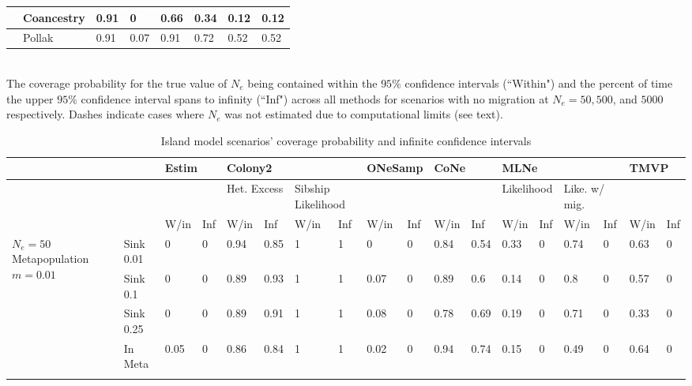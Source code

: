 \begin{landscape}
\begin{table}[h]
\begin{tabular}{ | l| p{2cm}|| l| l|| l| l|| l| l| }
 & Coancestry & 0.91 & 0 & 0.66 & 0.34 & 0.12 & 0.12  \\ \hline
 & Pollak & 0.91 & 0.07 & 0.91 & 0.72 & 0.52 & 0.52  \\ \hline
\end{tabular}
\bigskip{}
{\footnotesize \\ The coverage probability for the true value of $N_e$ being contained within the $95\%$ confidence intervals (``Within") and the percent of time the upper $95\%$ confidence interval spans to infinity (``Inf") across all methods for scenarios with no migration at $N_e = 50, 500$, and $5000$ respectively. Dashes indicate cases where $N_e$ was not estimated due to computational limits (see text).}
\end{table}



\begin{table}[h]
\centering \tiny
\caption[Island model scenarios' coverage probability and infinite confidence intervals]{Island model scenarios' coverage probability and infinite confidence intervals}
\label{tab:ne7}
\begin{tabular}{ | l| l|| l| l| l| l| l| l| l| l| l| l| l| l| l| l| l| l| }
\hline
\multicolumn{2}{l}{} & \multicolumn{2}{l}{Estim} & \multicolumn{4}{l}{Colony2} & \multicolumn{2}{l}{ONeSamp} & \multicolumn{2}{l}{CoNe} & \multicolumn{4}{l}{MLNe} & \multicolumn{2}{l}{TMVP}  \\ \hline
\multicolumn{2}{l}{} & \multicolumn{2}{l}{ } & \multicolumn{2}{l}{ Het. Excess} & \multicolumn{2}{l}{ Sibship Likelihood} & \multicolumn{2}{l}{ } & \multicolumn{2}{l}{ } & \multicolumn{2}{l}{Likelihood} & \multicolumn{2}{l}{Like. w/ mig.} & \multicolumn{2}{l}{ } \\ \hline
 &  & W/in & Inf & W/in & Inf & W/in & Inf & W/in & Inf & W/in & Inf & W/in & Inf & W/in & Inf & W/in & Inf   \\ \hline
\multirow{5}{1cm}{$N_e = 50$ Metapopulation $m = 0.01$} & Sink 0.01 & 0 & 0 & 0.94 & 0.85 & 1 & 1 & 0 & 0 & 0.84 & 0.54 & 0.33 & 0 & 0.74 & 0 & 0.63 & 0  \\ \cline{2-18}
  & Sink 0.1 & 0 & 0 & 0.89 & 0.93 & 1 & 1 & 0.07 & 0 & 0.89 & 0.6 & 0.14 & 0 & 0.8 & 0 & 0.57 & 0  \\ \cline{2-18}
  & Sink 0.25 & 0 & 0 & 0.89 & 0.91 & 1 & 1 & 0.08 & 0 & 0.78 & 0.69 & 0.19 & 0 & 0.71 & 0 & 0.33 & 0  \\ \cline{2-18}
  & In Meta & 0.05 & 0 & 0.86 & 0.84 & 1 & 1 & 0.02 & 0 & 0.94 & 0.74 & 0.15 & 0 & 0.49 & 0 & 0.64 & 0  \\ \cline{2-18}

\end{tabular}
\end{table}
\end{landscape}
